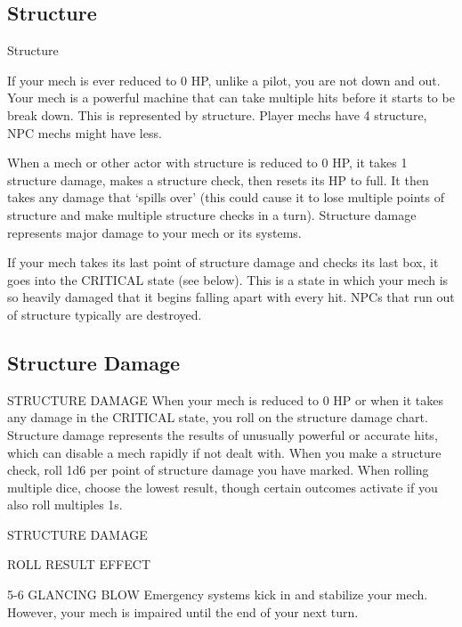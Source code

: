 \subsection{Structure}
                                                Structure  

If your mech is ever reduced to 0 HP, unlike a pilot, you are not down and out. Your mech is a  
powerful machine that can take multiple hits before it starts to be break down. This is  
represented by structure. Player mechs have 4 structure, NPC mechs might have less.
 

                                                                                                             


When a mech or other actor with structure is reduced to 0 HP, it takes 1 structure damage,  
makes a structure check, then resets its HP to full. It then takes any damage that ‘spills  
over’ (this could cause it to lose multiple points of structure and make multiple structure checks  
in a turn). Structure damage represents major damage to your mech or its systems.
 

If your mech takes its last point of structure damage and checks its last box, it goes into the  
CRITICAL state (see below). This is a state in which your mech is so heavily damaged that it  
begins falling apart with every hit. NPCs that run out of structure typically are destroyed.
 
\subsection{Structure Damage}
                                        STRUCTURE DAMAGE  
When your mech is reduced to 0 HP or when it takes any damage in the CRITICAL state, you roll  
on the structure damage chart. Structure damage represents the results of unusually powerful or  
accurate hits, which can disable a mech rapidly if not dealt with. When you make a structure  
check, roll 1d6 per point of structure damage you have marked. When rolling multiple dice,  
choose the lowest result, though certain outcomes activate if you also roll multiples 1s.
 

                                            STRUCTURE DAMAGE  

 ROLL            RESULT                   EFFECT 

 5-6             GLANCING BLOW            Emergency systems kick in and stabilize your mech. However, your  
                                          mech is impaired until the end of your next turn. 

